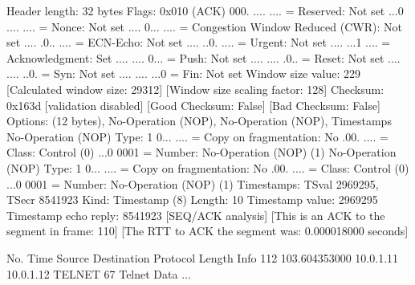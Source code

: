     Header length: 32 bytes
    Flags: 0x010 (ACK)
        000. .... .... = Reserved: Not set
        ...0 .... .... = Nonce: Not set
        .... 0... .... = Congestion Window Reduced (CWR): Not set
        .... .0.. .... = ECN-Echo: Not set
        .... ..0. .... = Urgent: Not set
        .... ...1 .... = Acknowledgment: Set
        .... .... 0... = Push: Not set
        .... .... .0.. = Reset: Not set
        .... .... ..0. = Syn: Not set
        .... .... ...0 = Fin: Not set
    Window size value: 229
    [Calculated window size: 29312]
    [Window size scaling factor: 128]
    Checksum: 0x163d [validation disabled]
        [Good Checksum: False]
        [Bad Checksum: False]
    Options: (12 bytes), No-Operation (NOP), No-Operation (NOP), Timestamps
        No-Operation (NOP)
            Type: 1
                0... .... = Copy on fragmentation: No
                .00. .... = Class: Control (0)
                ...0 0001 = Number: No-Operation (NOP) (1)
        No-Operation (NOP)
            Type: 1
                0... .... = Copy on fragmentation: No
                .00. .... = Class: Control (0)
                ...0 0001 = Number: No-Operation (NOP) (1)
        Timestamps: TSval 2969295, TSecr 8541923
            Kind: Timestamp (8)
            Length: 10
            Timestamp value: 2969295
            Timestamp echo reply: 8541923
    [SEQ/ACK analysis]
        [This is an ACK to the segment in frame: 110]
        [The RTT to ACK the segment was: 0.000018000 seconds]

No.     Time           Source                Destination           Protocol Length Info
    112 103.604353000  10.0.1.11             10.0.1.12             TELNET   67     Telnet Data ...

